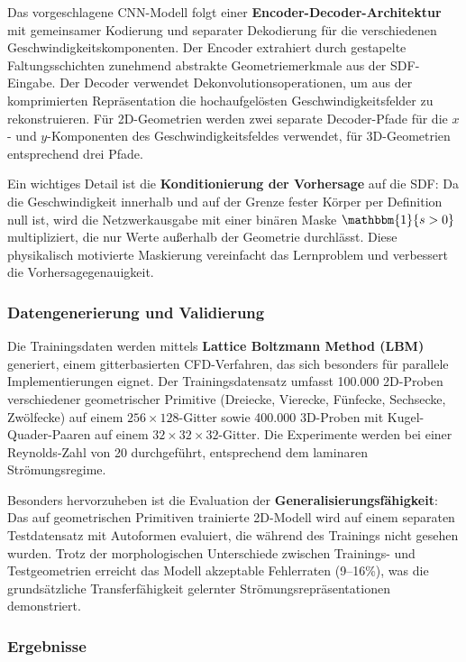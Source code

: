 \documentclass[a4paper,12pt]{article}
\begin{document}
Das vorgeschlagene CNN-Modell folgt einer \textbf{Encoder-Decoder-Architektur} mit gemeinsamer Kodierung und separater Dekodierung für die verschiedenen Geschwindigkeitskomponenten. Der Encoder extrahiert durch gestapelte Faltungsschichten zunehmend abstrakte Geometriemerkmale aus der SDF-Eingabe. Der Decoder verwendet Dekonvolutionsoperationen, um aus der komprimierten Repräsentation die hochaufgelösten Geschwindigkeitsfelder zu rekonstruieren. Für 2D-Geometrien werden zwei separate Decoder-Pfade für die $x$- und $y$-Komponenten des Geschwindigkeitsfeldes verwendet, für 3D-Geometrien entsprechend drei Pfade.

Ein wichtiges Detail ist die \textbf{Konditionierung der Vorhersage} auf die SDF: Da die Geschwindigkeit innerhalb und auf der Grenze fester Körper per Definition null ist, wird die Netzwerkausgabe mit einer binären Maske $\mathbbm{1}\{s > 0\}$ multipliziert, die nur Werte außerhalb der Geometrie durchlässt. Diese physikalisch motivierte Maskierung vereinfacht das Lernproblem und verbessert die Vorhersagegenauigkeit.

\subsubsection*{Datengenerierung und Validierung}

Die Trainingsdaten werden mittels \textbf{Lattice Boltzmann Method (LBM)} generiert, einem gitterbasierten CFD-Verfahren, das sich besonders für parallele Implementierungen eignet. Der Trainingsdatensatz umfasst 100.000 2D-Proben verschiedener geometrischer Primitive (Dreiecke, Vierecke, Fünfecke, Sechsecke, Zwölfecke) auf einem $256 \times 128$-Gitter sowie 400.000 3D-Proben mit Kugel-Quader-Paaren auf einem $32 \times 32 \times 32$-Gitter. Die Experimente werden bei einer Reynolds-Zahl von 20 durchgeführt, entsprechend dem laminaren Strömungsregime.

Besonders hervorzuheben ist die Evaluation der \textbf{Generalisierungsfähigkeit}: Das auf geometrischen Primitiven trainierte 2D-Modell wird auf einem separaten Testdatensatz mit Autoformen evaluiert, die während des Trainings nicht gesehen wurden. Trotz der morphologischen Unterschiede zwischen Trainings- und Testgeometrien erreicht das Modell akzeptable Fehlerraten (9--16\%), was die grundsätzliche Transferfähigkeit gelernter Strömungsrepräsentationen demonstriert.

\subsubsection*{Ergebnisse}
\end{document}

